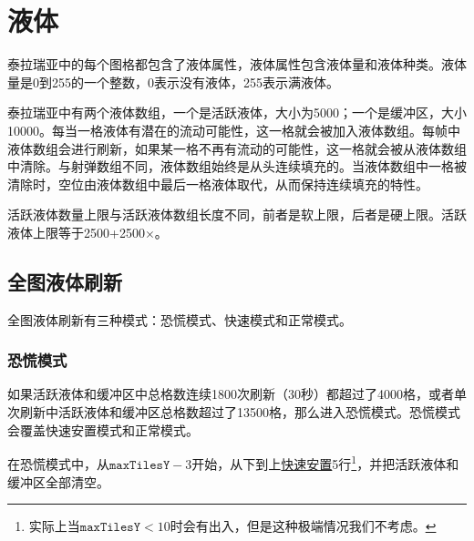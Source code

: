 \chapter{液体}\label{app23}

泰拉瑞亚中的每个图格都包含了液体属性，液体属性包含液体量和液体种类。液体量是0到255的一个整数，0表示没有液体，255表示满液体。

泰拉瑞亚中有两个液体数组，一个是活跃液体，大小为5000；一个是缓冲区，大小10000。每当一格液体有潜在的流动可能性，这一格就会被加入液体数组。每帧中液体数组会进行刷新，如果某一格不再有流动的可能性，这一格就会被从液体数组中清除。与射弹数组不同，液体数组始终是从头连续填充的。当液体数组中一格被清除时，空位由液体数组中最后一格液体取代，从而保持连续填充的特性。

活跃液体数量上限与活跃液体数组长度不同，前者是软上限，后者是硬上限。活跃液体上限等于2500+2500$\times$。

\section{全图液体刷新}
全图液体刷新有三种模式：恐慌模式、快速模式和正常模式。

\subsection{恐慌模式}
如果活跃液体和缓冲区中总格数连续1800次刷新（30秒）都超过了4000格，或者单次刷新中活跃液体和缓冲区总格数超过了13500格，那么进入恐慌模式。恐慌模式会覆盖快速安置模式和正常模式。

在恐慌模式中，从$\mathtt{maxTilesY}-3$开始，从下到上\hyperref[app30]{快速安置}5行\footnote{实际上当$\mathtt{maxTilesY}<10$时会有出入，但是这种极端情况我们不考虑。}，并把活跃液体和缓冲区全部清空。

